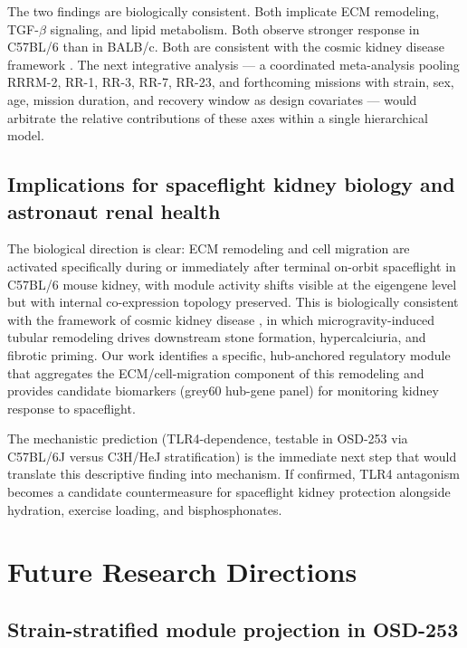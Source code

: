 \documentclass[11pt]{article}
\begin{document}
The two findings are biologically consistent. Both implicate ECM remodeling, TGF-$\beta$ signaling, and lipid metabolism. Both observe stronger response in C57BL/6 than in BALB/c. Both are consistent with the cosmic kidney disease framework \citep{siew2024cosmic}. The next integrative analysis --- a coordinated meta-analysis pooling RRRM-2, RR-1, RR-3, RR-7, RR-23, and forthcoming missions with strain, sex, age, mission duration, and recovery window as design covariates --- would arbitrate the relative contributions of these axes within a single hierarchical model.

\subsection{Implications for spaceflight kidney biology and astronaut renal health}

The biological direction is clear: ECM remodeling and cell migration are activated specifically during or immediately after terminal on-orbit spaceflight in C57BL/6 mouse kidney, with module activity shifts visible at the eigengene level but with internal co-expression topology preserved. This is biologically consistent with the framework of cosmic kidney disease \citep{siew2024cosmic}, in which microgravity-induced tubular remodeling drives downstream stone formation, hypercalciuria, and fibrotic priming. Our work identifies a specific, hub-anchored regulatory module that aggregates the ECM/cell-migration component of this remodeling and provides candidate biomarkers (grey60 hub-gene panel) for monitoring kidney response to spaceflight.

The mechanistic prediction (TLR4-dependence, testable in OSD-253 via C57BL/6J versus C3H/HeJ stratification) is the immediate next step that would translate this descriptive finding into mechanism. If confirmed, TLR4 antagonism becomes a candidate countermeasure for spaceflight kidney protection alongside hydration, exercise loading, and bisphosphonates.

\section{Future Research Directions}

\subsection{Strain-stratified module projection in OSD-253}
\end{document}
